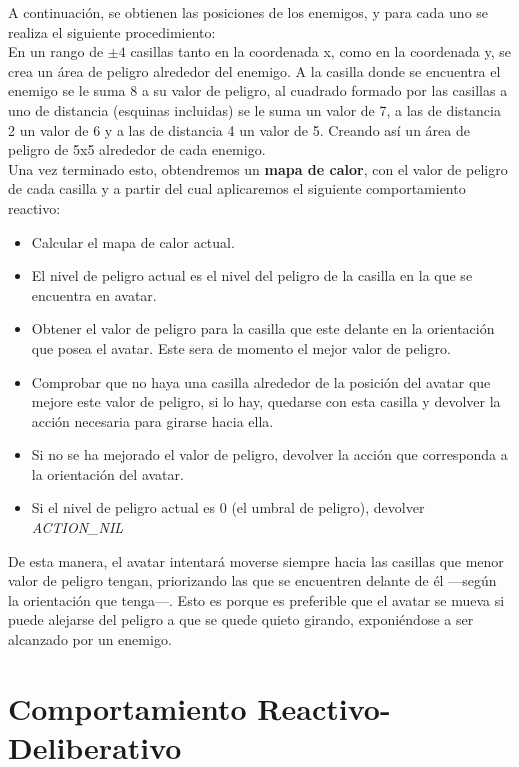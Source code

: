 A continuación, se obtienen las posiciones de los enemigos, y para cada uno se realiza el siguiente procedimiento: \\
En un rango de $\pm 4$ casillas tanto en la coordenada x, como en la coordenada y, se crea un área de peligro alrededor del enemigo. A la casilla donde se encuentra el enemigo se le suma 8 a su valor de peligro, al cuadrado formado por las casillas a uno de distancia (esquinas incluidas) se le suma un valor de 7, a las de distancia 2 un valor de 6 y a las de distancia 4 un valor de 5. Creando así un área de peligro de 5x5 alrededor de cada enemigo.\\

Una vez terminado esto, obtendremos un \textbf{mapa de calor}, con el valor de peligro de cada casilla y a partir del cual aplicaremos el siguiente comportamiento reactivo:
\begin{itemize}
   \item Calcular el mapa de calor actual.
   \item El nivel de peligro actual es el nivel del peligro de la casilla en la que se encuentra en avatar.
   \item Obtener el valor de peligro para la casilla que este delante en la orientación que posea el avatar. Este sera de momento el mejor valor de peligro.
   \item Comprobar que no haya una casilla alrededor de la posición del avatar que mejore este valor de peligro, si lo hay, quedarse con esta casilla y devolver la acción necesaria para girarse hacia ella.
   \item Si no se ha mejorado el valor de peligro, devolver la acción que corresponda a la orientación del avatar.
   \item Si el nivel de peligro actual es 0 (el umbral de peligro), devolver \emph{ACTION\_NIL}
\end{itemize}

De esta manera, el avatar intentará moverse siempre hacia las casillas que menor valor de peligro tengan, priorizando las que se encuentren delante de él ---según la orientación que tenga---. Esto es porque es preferible que el avatar se mueva si puede alejarse del peligro a que se quede quieto girando, exponiéndose a ser alcanzado por un enemigo.

\newpage
\chapter{Comportamiento Reactivo-Deliberativo}

